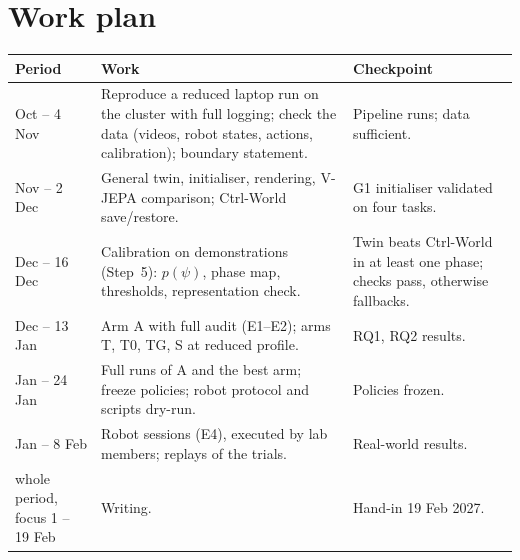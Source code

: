 \documentclass[11pt,a4paper]{article}
\theoremstyle{plain}
\theoremstyle{definition}
\theoremstyle{remark}
\begin{document}
\section{Work plan}\label{sec:plan}
\begin{center}\small
\begin{tabularx}{\linewidth}{@{}>{\raggedright\arraybackslash}p{3.1cm}>{\raggedright\arraybackslash}X>{\raggedright\arraybackslash}p{4.6cm}@{}}
\toprule
\textbf{Period} & \textbf{Work} & \textbf{Checkpoint}\\
\midrule
15 Oct -- 4 Nov & Reproduce a reduced laptop run on the cluster with full logging; check the data (videos, robot states, actions, calibration); boundary statement. & Pipeline runs; data sufficient.\\
5 Nov -- 2 Dec & General twin, initialiser, rendering, V-JEPA comparison; Ctrl-World save/restore. & G1 initialiser validated on four tasks.\\
3 Dec -- 16 Dec & Calibration on demonstrations (Step~5): $p(\psi)$, phase map, thresholds, representation check. & Twin beats Ctrl-World in at least one phase; checks pass, otherwise fallbacks.\\
17 Dec -- 13 Jan & Arm A with full audit (E1--E2); arms T, T0, TG, S at reduced profile. & RQ1, RQ2 results.\\
14 Jan -- 24 Jan & Full runs of A and the best arm; freeze policies; robot protocol and scripts dry-run. & Policies frozen.\\
25 Jan -- 8 Feb & Robot sessions (E4), executed by lab members; replays of the trials. & Real-world results.\\
whole period, focus 1 -- 19 Feb & Writing. & Hand-in 19 Feb 2027.\\
\bottomrule
\end{tabularx}
\end{center}

\end{document}
